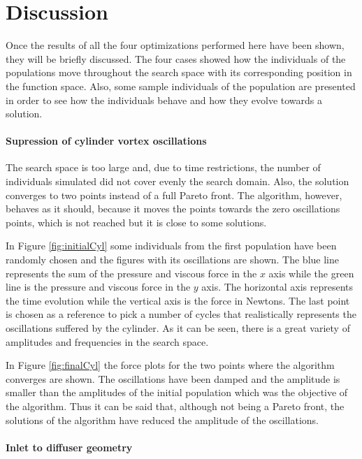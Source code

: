 \chapter{Discussion}

Once the results of all the four optimizations performed here have been shown, they will be briefly discussed. The four cases showed how the individuals of the populations move throughout the search space with its corresponding position in the function space. Also, some sample individuals of the population are presented in order to see how the individuals behave and how they evolve towards a solution. 

\subsubsection*{Supression of cylinder vortex oscillations}

The search space is too large and, due to time restrictions, the number of individuals simulated did not cover evenly the search domain. Also, the solution converges to two points instead of a full Pareto front. The algorithm, however, behaves as it should, because it moves the points towards the zero oscillations points, which is not reached but it is close to some solutions. 

In Figure \ref{fig:initialCyl} some individuals from the first population have been randomly chosen and the figures with its oscillations are shown. The blue line represents the sum of the pressure and viscous force in the $x$ axis while the green line is the pressure and viscous force in the $y$ axis. The horizontal axis represents the time evolution while the vertical axis is the force in Newtons. The last point is chosen as a reference to pick a number of cycles that realistically represents the oscillations suffered by the cylinder. As it can be seen, there is a great variety of amplitudes and frequencies in the search space.

In Figure \ref{fig:finalCyl} the force plots for the two points where the algorithm converges are shown. The oscillations have been damped and the amplitude is smaller than the amplitudes of the initial population which was the objective of the algorithm. Thus it can be said that, although not being a Pareto front, the solutions of the algorithm have reduced the amplitude of the oscillations. 

\subsubsection*{Inlet to diffuser geometry}

